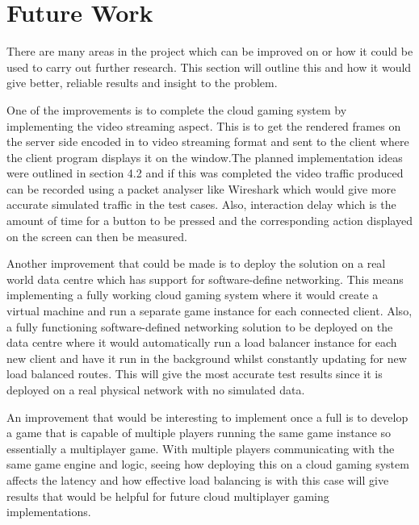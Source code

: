 \section{Future Work}
There are many areas in the project which can be improved on or how it could be used to carry out further research. This section will outline this and how it would give better, reliable results and insight to the problem.
\newline
\par
One of the improvements is to complete the cloud gaming system by implementing the video streaming aspect. This is to get the rendered frames on the server side encoded in to video streaming format and sent to the client where the client program displays it on the window.The planned implementation ideas were outlined in section 4.2 and if this was completed the video traffic produced can be recorded using a packet analyser like Wireshark which would give more accurate simulated traffic in the test cases. Also, interaction delay which is the amount of time for a button to be pressed and the corresponding action displayed on the screen can then be measured.
\newline
\par
Another improvement that could be made is to deploy the solution on a real world data centre which has support for software-define networking. This means implementing a fully working cloud gaming system where it would create a virtual machine and run a separate game instance for each connected client. Also, a fully functioning software-defined networking solution to be deployed on the data centre where it would automatically run a load balancer instance for each new client and have it run in the background whilst constantly updating for new load balanced routes. This will give the most accurate test results since it is deployed on a real physical network with no simulated data.
\newline
\par
An improvement that would be interesting to implement once a full is to develop a game that is capable of multiple players running the same game instance so essentially a multiplayer game. With multiple players communicating with the same game engine and logic, seeing how deploying this on a cloud gaming system affects the latency and how effective load balancing is with this case will give results that would be helpful for future cloud multiplayer gaming implementations.

